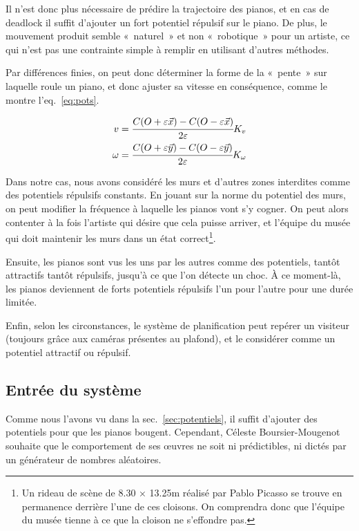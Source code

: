\documentclass[french,A4paper,]{book}
\begin{document}
Il n'est donc plus nécessaire de prédire la trajectoire des pianos, et
en cas de deadlock il suffit d'ajouter un fort potentiel répulsif sur le
piano. De plus, le mouvement produit semble «~naturel~» et non
«~robotique~» pour un artiste, ce qui n'est pas une contrainte simple à
remplir en utilisant d'autres méthodes.

Par différences finies, on peut donc déterminer la forme de la «~pente~»
sur laquelle roule un piano, et donc ajuster sa vitesse en conséquence,
comme le montre l'eq.~\ref{eq:pots}.

\begin{equation} \begin{aligned}
v &= \cfrac{C(O + \varepsilon \vec{x}) - C(O - \varepsilon \vec{x})}{2\varepsilon} K_v \\
\omega &= \cfrac{C(O + \varepsilon \vec{y}) - C(O - \varepsilon \vec{y})}{2\varepsilon} K_{\omega_{}}
\end{aligned} \label{eq:pots}\end{equation}

Dans notre cas, nous avons considéré les murs et d'autres zones
interdites comme des potentiels répulsifs constants. En jouant sur la
norme du potentiel des murs, on peut modifier la fréquence à laquelle
les pianos vont s'y cogner. On peut alors contenter à la fois l'artiste
qui désire que cela puisse arriver, et l'équipe du musée qui doit
maintenir les murs dans un état correct\footnote{Un rideau de scène de
  8.30 × 13.25m réalisé par Pablo Picasso se trouve en permanence
  derrière l'une de ces cloisons. On comprendra donc que l'équipe du
  musée tienne à ce que la cloison ne s'effondre pas.}.

Ensuite, les pianos sont vus les uns par les autres comme des
potentiels, tantôt attractifs tantôt répulsifs, jusqu'à ce que l'on
détecte un choc. À ce moment-là, les pianos deviennent de forts
potentiels répulsifs l'un pour l'autre pour une durée limitée.

Enfin, selon les circonstances, le système de planification peut repérer
un visiteur (toujours grâce aux caméras présentes au plafond), et le
considérer comme un potentiel attractif ou répulsif.

\subsection{Entrée du système}\label{entruxe9e-du-systuxe8me}

Comme nous l'avons vu dans la sec.~\ref{sec:potentiels}, il suffit
d'ajouter des potentiels pour que les pianos bougent. Cependant, Céleste
Boursier-Mougenot souhaite que le comportement de ses œuvres ne soit ni
prédictibles, ni dictés par un générateur de nombres aléatoires.
\end{document}

